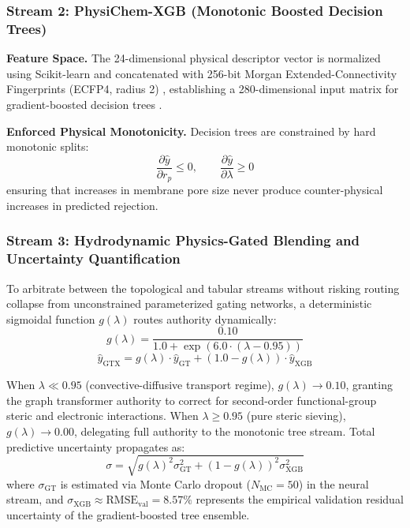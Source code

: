 \documentclass[11pt]{article}
\begin{document}
\subsubsection{Stream 2: PhysiChem-XGB (Monotonic Boosted Decision Trees)}

\textbf{Feature Space.} The 24-dimensional physical descriptor vector is normalized using Scikit-learn \cite{pedregosa2011} and concatenated with 256-bit Morgan Extended-Connectivity Fingerprints (ECFP4, radius 2) \cite{rogers2010}, establishing a 280-dimensional input matrix for gradient-boosted decision trees \cite{chen2016,ke2017}.

\textbf{Enforced Physical Monotonicity.} Decision trees are constrained by hard monotonic splits:
\begin{equation}
\frac{\partial \hat{y}}{\partial r_p} \leq 0, \qquad \frac{\partial \hat{y}}{\partial \lambda} \geq 0
\label{eq:monotonic}
\end{equation}
ensuring that increases in membrane pore size never produce counter-physical increases in predicted rejection.

\subsubsection{Stream 3: Hydrodynamic Physics-Gated Blending and Uncertainty Quantification}

To arbitrate between the topological and tabular streams without risking routing collapse from unconstrained parameterized gating networks, a deterministic sigmoidal function $g(\lambda)$ routes authority dynamically:
\begin{equation}
g(\lambda) = \frac{0.10}{1.0 + \exp\left(6.0 \cdot (\lambda - 0.95)\right)}
\label{eq:gate}
\end{equation}
\begin{equation}
\hat{y}_{\mathrm{GTX}} = g(\lambda) \cdot \hat{y}_{\mathrm{GT}} + \left(1.0 - g(\lambda)\right) \cdot \hat{y}_{\mathrm{XGB}}
\label{eq:mixture}
\end{equation}

When $\lambda \ll 0.95$ (convective-diffusive transport regime), $g(\lambda) \to 0.10$, granting the graph transformer authority to correct for second-order functional-group steric and electronic interactions. When $\lambda \geq 0.95$ (pure steric sieving), $g(\lambda) \to 0.00$, delegating full authority to the monotonic tree stream. Total predictive uncertainty propagates as:
\begin{equation}
\sigma = \sqrt{g(\lambda)^2 \sigma_{\mathrm{GT}}^2 + \left(1-g(\lambda)\right)^2 \sigma_{\mathrm{XGB}}^2}
\label{eq:mixture_sigma}
\end{equation}
where $\sigma_{\mathrm{GT}}$ is estimated via Monte Carlo dropout ($N_{\mathrm{MC}} = 50$) in the neural stream, and $\sigma_{\mathrm{XGB}} \approx \mathrm{RMSE}_{\mathrm{val}} = 8.57\%$ represents the empirical validation residual uncertainty of the gradient-boosted tree ensemble.
\end{document}
